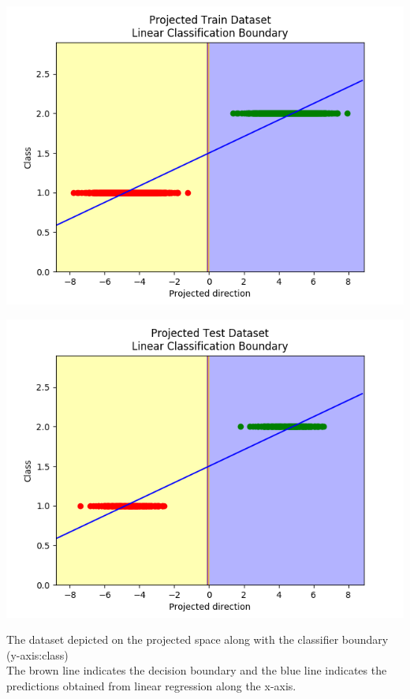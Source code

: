 \documentclass[paper=a4, fontsize=11pt]{scrartcl}
\numberwithin{equation}{section}		%
\numberwithin{figure}{section}			%
\numberwithin{table}{section}				%
\begin{document}
\begin{center}
\includegraphics[scale=0.5]{q2_5}
\end{center}

\begin{center}
\includegraphics[scale=0.5]{q2_6}
\end{center}

The dataset depicted on the projected space along with the classifier boundary (y-axis:class)\\

The brown line indicates the decision boundary and the blue line indicates the predictions obtained from linear regression along the x-axis.
\end{document}
